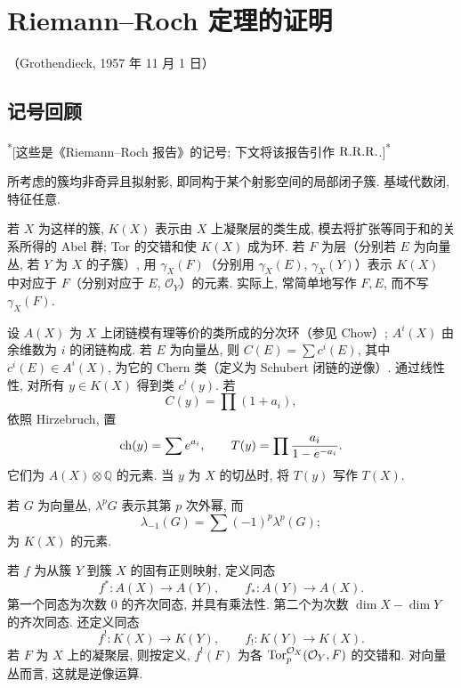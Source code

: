 \section*{Riemann--Roch 定理的证明\protect\footnotemark}
\begin{center}
（Grothendieck, 1957 年 11 月 1 日）
\end{center}

\subsection*{记号回顾}
\textsuperscript{*}[这些是《Riemann--Roch 报告》的记号; 下文将该报告引作 \(\mathrm{R.R.R.}\).]\textsuperscript{*}

所考虑的簇均非奇异且拟射影, 即同构于某个射影空间的局部闭子簇. 基域代数闭, 特征任意.

若 \(X\) 为这样的簇, \(K(X)\) 表示由 \(X\) 上凝聚层的类生成, 模去将扩张等同于和的关系所得的 Abel 群; Tor 的交错和使 \(K(X)\) 成为环. 若 \(F\) 为层（分别若 \(E\) 为向量丛, 若 \(Y\) 为 \(X\) 的子簇）, 用 \(\gamma_X(F)\)（分别用 \(\gamma_X(E)\), \(\gamma_X(Y)\)）表示 \(K(X)\) 中对应于 \(F\)（分别对应于 \(E\), \(\mathcal O_Y\)）的元素. 实际上, 常简单地写作 \(F,E\), 而不写 \(\gamma_X(F)\).

设 \(A(X)\) 为 \(X\) 上闭链模有理等价的类所成的分次环（参见 Chow）; \(A^i(X)\) 由余维数为 \(i\) 的闭链构成. 若 \(E\) 为向量丛, 则 \(C(E)=\sum c^i(E)\), 其中 \(c^i(E)\in A^i(X)\), 为它的 Chern 类（定义为 Schubert 闭链的逆像）. 通过线性性, 对所有 \(y\in K(X)\) 得到类 \(c^i(y)\). 若
\[
  C(y)=\prod (1+a_i),
\]
依照 Hirzebruch, 置
\[
  \operatorname{ch}(y)=\sum e^{a_i},\qquad
  T(y)=\prod\frac{a_i}{1-e^{-a_i}}.
\]
它们为 \(A(X)\otimes\mathbb Q\) 的元素. 当 \(y\) 为 \(X\) 的切丛时, 将 \(T(y)\) 写作 \(T(X)\).

若 \(G\) 为向量丛, \(\lambda^pG\) 表示其第 \(p\) 次外幂, 而
\[
  \lambda_{-1}(G)=\sum(-1)^p\lambda^p(G);
\]
为 \(K(X)\) 的元素.

若 \(f\) 为从簇 \(Y\) 到簇 \(X\) 的固有正则映射, 定义同态
\[
  f^*:A(X)\longrightarrow A(Y),\qquad
  f_*:A(Y)\longrightarrow A(X).
\]
第一个同态为次数 \(0\) 的齐次同态, 并具有乘法性. 第二个为次数 \(\dim X-\dim Y\) 的齐次同态. 还定义同态
\[
  f^!:K(X)\longrightarrow K(Y),\qquad
  f_!:K(Y)\longrightarrow K(X).
\]
若 \(F\) 为 \(X\) 上的凝聚层, 则按定义, \(f^!(F)\) 为各 \(\operatorname{Tor}_p^{\mathcal O_X}(\mathcal O_Y,F)\) 的交错和. 对向量丛而言, 这就是逆像运算.

